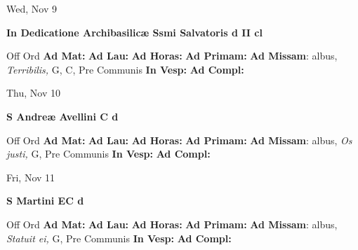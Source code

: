 \documentclass[10pt]{memoir}
\begin{document}
\begin{center}
\begin{minipage}{3.5in}
\vspace{2em}
\begin{center}Wed, Nov 9
\end{center}
\textbf{ \large In Dedicatione Archibasilicæ Ssmi Salvatoris
\textnormal{\normalsize d II cl}}

\begin{justify}Off Ord
\textbf{Ad Mat: }
\textbf{Ad Lau: }
\textbf{Ad Horas: }
\textbf{Ad Primam: }\textbf{Ad Missam}: albus, \textit{Terribilis,} G, C, Pre Communis
\textbf{In Vesp: }
\textbf{Ad Compl: }
\end{justify}
\end{minipage}
\end{center}

\begin{center}
\begin{minipage}{3.5in}
\vspace{2em}
\begin{center}Thu, Nov 10
\end{center}
\textbf{ \large S Andreæ Avellini C
\textnormal{\normalsize d}}

\begin{justify}Off Ord
\textbf{Ad Mat: }
\textbf{Ad Lau: }
\textbf{Ad Horas: }
\textbf{Ad Primam: }\textbf{Ad Missam}: albus, \textit{Os justi,} G, Pre Communis
\textbf{In Vesp: }
\textbf{Ad Compl: }
\end{justify}
\end{minipage}
\end{center}

\begin{center}
\begin{minipage}{3.5in}
\vspace{2em}
\begin{center}Fri, Nov 11
\end{center}
\textbf{ \large S Martini  EC
\textnormal{\normalsize d}}

\begin{justify}Off Ord
\textbf{Ad Mat: }
\textbf{Ad Lau: }
\textbf{Ad Horas: }
\textbf{Ad Primam: }\textbf{Ad Missam}: albus, \textit{Statuit ei,} G, Pre Communis
\textbf{In Vesp: }
\textbf{Ad Compl: }
\end{justify}
\end{minipage}
\end{center}
\end{document}

